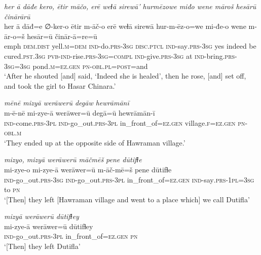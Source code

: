 \ea \label{ZP.61}
\textit{her ā dāđe kero, ētir māčo, erē weɫā sirewā’ hurmēzowe miđo wene māroš hesārū činārārū} \\ 
\gll her ā dāđ=e ∅-ker-o ētir m-āč-o erē weɫā sirewā hur-m-ēz-o=we mi-đe-o wene m-ār-o=š hesār=ū činār-ā=re=ū \\ 
 emph \textsc{dem.dist} yell\textsc{.m}\textsc{=dem} \textsc{ind-}do\textsc{.prs}\textsc{-3sg} \textsc{disc.ptcl} \textsc{ind-}say\textsc{.prs}\textsc{-3sg} yes indeed be cured\textsc{.pst}\textsc{.3sg} \textsc{pvb-}\textsc{ind-}rise\textsc{.prs}\textsc{-3sg}\textsc{=compl} \textsc{ind-}give\textsc{.prs}\textsc{-3sg} at \textsc{ind-}bring\textsc{.prs}\textsc{-3sg}\textsc{=3sg} pond\textsc{.m}\textsc{\textsc{=ez.gen}} \textsc{pn}\textsc{-obl}\textsc{.pl}\textsc{=\textsc{post}}=and \\ 
\glt `After he shouted [and] said, ‘Indeed she is healed’, then he rose, [and] set off, and took the girl to Hasar Chinara.'
\z 
 
\ea \label{ZP.62}
\textit{mēnē mizyā werāwerū degāw hewrāmānī} \\ 
\gll m-ē-nē mi-zye-ā werāwer=ū degā=ū hewrāmān-ī \\ 
 \textsc{ind-}come\textsc{.prs}\textsc{-3pl} \textsc{ind-}go\_out\textsc{.prs}\textsc{-3pl} in\_front\_of\textsc{\textsc{=ez.gen}} village\textsc{.f}\textsc{\textsc{=ez.gen}} \textsc{pn}\textsc{-obl}\textsc{.m} \\ 
\glt `They ended up at the opposite side of Hawraman village.'
\z 
 
\ea \label{ZP.63}
\textit{mizyo, mizyā werāwerū māčmēš pene dūtifɫe} \\ 
\gll mi-zye-o mi-zye-ā werāwer=ū m-āč-mē=š pene dūtifɫe \\ 
 \textsc{ind-}go\_out\textsc{.prs}\textsc{-3sg} \textsc{ind-}go\_out\textsc{.prs}\textsc{-3pl} in\_front\_of\textsc{\textsc{=ez.gen}} \textsc{ind-}say\textsc{.prs}\textsc{-1pl}\textsc{=3sg} to \textsc{pn} \\ 
\glt `[Then] they left [Hawraman village and went to a place which] we call Dutifla'
\z 
 
\ea \label{ZP.64}
\textit{mizyā werāwerū dūtifɫey} \\ 
\gll mi-zye-ā werāwer=ū dūtifɫey \\ 
 \textsc{ind-}go\_out\textsc{.prs}\textsc{-3pl} in\_front\_of\textsc{\textsc{=ez.gen}} \textsc{pn} \\ 
\glt `[Then] they left Dutifla'
\z 
 
